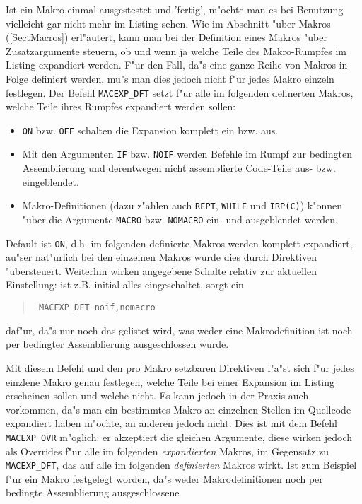 \documentclass[12pt,a4paper,twoside]{report}
\newcommand{\tty}[1]{{\tt #1}}
\begin{document}
Ist ein Makro einmal ausgestestet und 'fertig', m"ochte man es bei
Benutzung vielleicht gar nicht mehr im Listing sehen.  Wie im
Abschnitt "uber Makros (\ref{SectMacros}) erl"autert, kann man bei der
Definition eines Makros "uber Zusatzargumente steuern, ob und wenn ja
welche Teile des Makro-Rumpfes im Listing expandiert werden.  F"ur den
Fall, da"s eine ganze Reihe von Makros in Folge definiert werden,
mu"s man dies jedoch nicht f"ur jedes Makro einzeln festlegen.  Der
Befehl \tty{MACEXP\_DFT} setzt f"ur alle im folgenden definerten Makros,
welche Teile ihres Rumpfes expandiert werden sollen:
\begin{itemize}
\item{\tty{ON} bzw. \tty{OFF} schalten die Expansion komplett
      ein bzw. aus.}
\item{Mit den Argumenten \tty{IF} bzw. \tty{NOIF} werden Befehle
      im Rumpf zur bedingten Assemblierung und derentwegen nicht
      assemblierte Code-Teile aus- bzw. eingeblendet.}
\item{Makro-Definitionen (dazu z"ahlen auch \tty{REPT},
      \tty{WHILE} und \tty{IRP(C)}) k"onnen "uber die Argumente
      \tty{MACRO} bzw. \tty{NOMACRO} ein- und
      ausgeblendet werden.}
\end{itemize}
Default ist \tty{ON}, d.h. im folgenden definierte Makros werden
komplett expandiert, au"ser nat"urlich bei den einzelnen Makros wurde
dies durch Direktiven "ubersteuert.  Weiterhin wirken angegebene Schalte
relativ zur aktuellen Einstellung: ist z.B. initial alles eingeschaltet,
sorgt ein
\begin{quote}{\tt
        MACEXP\_DFT  noif,nomacro
}\end{quote}
daf"ur, da"s nur noch das gelistet wird, was weder eine Makrodefinition
ist noch per bedingter Assemblierung ausgeschlossen wurde.
\par
Mit diesem Befehl und den pro Makro setzbaren Direktiven l"a"st sich
f"ur jedes einzlene Makro genau festlegen, welche Teile bei einer
Expansion im Listing erscheinen sollen und welche nicht.  Es kann
jedoch in der Praxis auch vorkommen, da"s man ein bestimmtes Makro an
einzelnen Stellen im Quellcode expandiert haben m"ochte, an anderen
jedoch nicht.  Dies ist mit dem Befehl \tty{MACEXP\_OVR} m"oglich: er
akzeptiert die gleichen Argumente, diese wirken jedoch als Overrides
f"ur alle im folgenden {\em expandierten} Makros, im Gegensatz zu
\tty{MACEXP\_DFT}, das auf alle im folgenden {\em definierten} Makros
wirkt.  Ist zum Beispiel f"ur ein Makro festgelegt worden, da"s weder
Makrodefinitionen noch per bedingte Assemblierung ausgeschlossene
\end{document}
